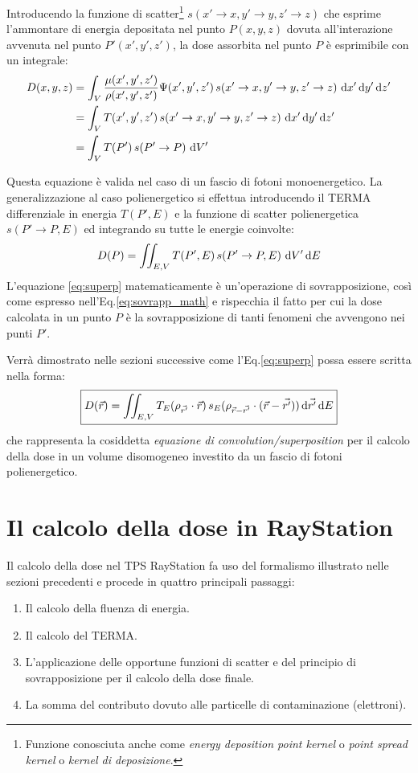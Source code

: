 {Introducendo la funzione di scatter\footnote{Funzione conosciuta anche come \textit{energy deposition point kernel} o \textit{point spread kernel} o \textit{kernel di deposizione}.} $s(x'\rightarrow x, y'\rightarrow y, z'\rightarrow z)$ che esprime l'ammontare di energia depositata nel punto $P(x,y,z)$ dovuta all'interazione avvenuta nel punto $P'(x',y',z')$, la dose assorbita nel punto $P$ è esprimibile con un integrale:
\begin{align}
D(x,y,z) &=  \int_V \frac{\mu(x',y',z')}{\rho(x',y',z')} \Psi(x',y',z')\,s(x'\rightarrow x, y'\rightarrow y, z'\rightarrow z)\, \,\text{d} x' \,\text{d} y' \,\text{d} z'\\
         &= \int_V T(x',y',z')\,s(x'\rightarrow x, y'\rightarrow y, z'\rightarrow z)\, \,\text{d} x' \,\text{d} y' \,\text{d} z'\\
         &= \int_V T(P')\,s(P'\rightarrow P)\, \,\text{d} V'
\end{align}

Questa equazione è valida nel caso di un fascio di fotoni monoenergetico. La generalizzazione al caso polienergetico si effettua introducendo il TERMA differenziale in energia $T(P',E)$ e la funzione di scatter polienergetica $s(P'\rightarrow P,E)$ ed integrando su tutte le energie coinvolte:
\begin{equation}
D(P) = \iint_{E,V} T(P',E)\,s(P'\rightarrow P,E)\, \,\text{d} V' \,\text{d} E
\label{eq:superp}
\end{equation}
L'equazione \eqref{eq:superp} matematicamente è un'operazione di sovrapposizione, così come espresso nell'Eq.\eqref{eq:sovrapp_math} e rispecchia il fatto per cui la dose calcolata in un punto $P$ è la sovrapposizione di tanti fenomeni che avvengono nei punti $P'$.

Verrà dimostrato nelle sezioni successive come l'Eq.\eqref{eq:superp} possa essere scritta nella forma:
\begin{equation}
\boxed{D(\vec{r}) = \iint_{E,V} T_E(\rho_{\vec{r'}} \cdot \vec{r})\, s_E(\rho_{\vec{r}-\vec{r'}}\cdot (\vec{r}-\vec{r'}))\,\text{d}\vec{r'} \,\text{d} E}
\label{eq:superp_true}
\end{equation}
che rappresenta la cosiddetta \textit{equazione di convolution/superposition} per il calcolo della dose in un volume disomogeneo investito da un fascio di fotoni polienergetico.



\section{Il calcolo della dose in RayStation}
\label{sec:algo_Ray}
Il calcolo della dose nel TPS RayStation fa uso del formalismo illustrato nelle sezioni precedenti e procede in quattro principali passaggi:
\begin{enumerate}
\item Il calcolo della fluenza di energia.
\item Il calcolo del TERMA.
\item L'applicazione delle opportune funzioni di scatter e del principio di sovrapposizione per il calcolo della dose finale.
\item La somma del contributo dovuto alle particelle di contaminazione (elettroni).
\end{enumerate}

}
